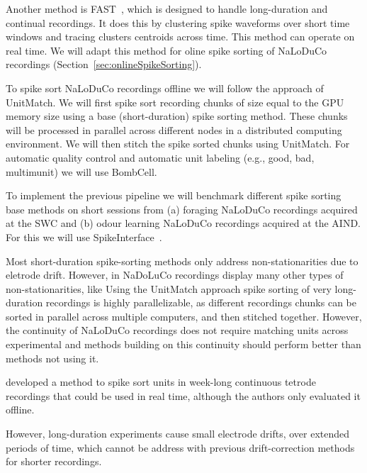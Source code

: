 Another method is FAST~\citep{dhawaleEtAl17A}, which is designed to handle
long-duration and continual recordings. It does this by clustering spike
waveforms over short time windows and tracing clusters centroids across time.
This method can operate on real time. We will adapt this method for oline spike
sorting of NaLoDuCo recordings (Section~\ref{sec:onlineSpikeSorting}).

To spike sort NaLoDuCo recordings offline we will follow the approach of
UnitMatch. We will first spike sort recording chunks of size equal to the GPU
memory size using a base (short-duration) spike sorting method. These chunks
will be processed in parallel across different nodes in a distributed computing
environment.
%
We will then stitch the spike sorted chunks using UnitMatch.
%
For automatic quality control and automatic unit labeling (e.g., good, bad,
multimunit) we will use BombCell.

To implement the previous pipeline we will benchmark different spike sorting
base methods on short sessions from (a) foraging NaLoDuCo recordings acquired
at the SWC and (b) odour learning NaLoDuCo recordings acquired at the AIND. For
this we will use SpikeInterface~\citep{buccinoEtAl20}.

Most short-duration spike-sorting methods only address non-stationarities due to
eletrode drift. However, in NaDoLuCo recordings display many other types of
non-stationarities, like 
Using the UnitMatch approach spike sorting of very long-duration recordings is
highly parallelizable, as different recordings chunks can be sorted in parallel
across multiple computers, and then stitched together.
However, the continuity of NaLoDuCo recordings does not require matching units
across experimental and methods building on this continuity should perform
better than methods not using it.

\citep{dhawaleEtAl17} developed a method to spike sort units in week-long continuous
tetrode recordings that could be used in real time, although the authors only
evaluated it offline.

However, long-duration experiments cause small electrode drifts, over extended
periods of time, which cannot be address with previous drift-correction methods
for shorter recordings.



